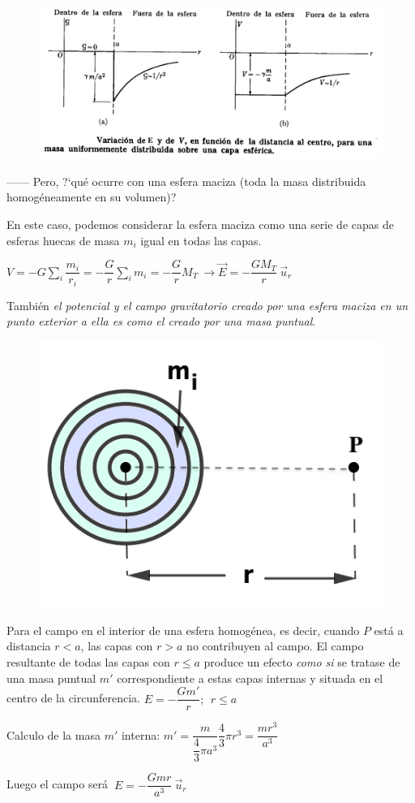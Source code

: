 \begin{figure}[H]
	\centering
	\includegraphics[width=.75\textwidth]{imagenes/imagenes14/T14IM13.png}
\end{figure}

------ Pero, ?`qué ocurre con una esfera maciza (toda la masa distribuida homogéneamente en su volumen)?

En este caso, podemos considerar la esfera maciza como una serie de capas de esferas huecas de masa $m_i$ igual en todas las capas.

$\displaystyle V=-G \sum_i \dfrac {m_i}{r_i} =-\dfrac G r \sum_i m_i = -\dfrac G r M_T \ \to \vec E=-\dfrac {GM_T} r \ \vec u_r $

\begin{multicols}{2}
También \emph{el potencial y el campo gravitatorio creado por una esfera maciza en un punto exterior a ella es como el creado por una masa puntual}.
\begin{figure}[H]
	\centering
	\includegraphics[width=.25\textwidth]{imagenes/imagenes14/T14IM11.png}
\end{figure}	
\end{multicols}

Para el campo en el interior de una esfera homogénea, es decir, cuando $P$ está a distancia $r<a$, las capas con $r>a$ no contribuyen al campo. El campo resultante de todas las capas con $r\leq a$ produce un efecto \emph{como si} se tratase de una masa puntual $m'$ correspondiente a estas capas internas y situada en el centro de la circunferencia.
$E=-\dfrac{Gm'}{r};\ \ r\leq a$

Calculo de la masa $m'$ interna: $m'=\dfrac{m}{\dfrac 4 3 \pi a^3} \dfrac 4 3 \pi r^3=\dfrac{mr^3}{a^3}$

Luego el campo será $\ E=-\dfrac{Gmr}{a^3}\ \vec u_r$

